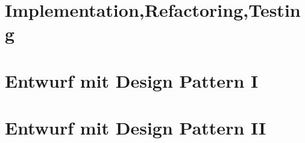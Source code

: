 \documentclass{article}
\begin{document}
\section{Implementation,Refactoring,Testing}



\section{Entwurf mit Design Pattern I}





\section{Entwurf mit Design Pattern II}

\end{document}
